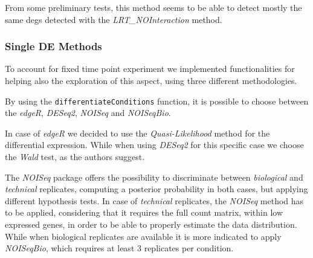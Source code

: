From some preliminary tests, this method seems to be able to detect mostly the same \glspl{deg} detected with the \textit{LRT\_NOInteraction} method.

%


\subsubsection{Single DE Methods}

To account for fixed time point experiment we implemented functionalities for helping also the exploration of this aspect, using three different methodologies.
 

By using the \lstinline!differentiateConditions! function, it is possible to choose between the \textit{edgeR}, \textit{DESeq2}, \textit{NOISeq} and \textit{NOISeqBio}.

In case of \textit{edgeR} we decided to use the \textit{Quasi-Likelihood} method for the differential expression.
While when using \textit{DESeq2} for this specific case we choose the \textit{Wald} test, as the authors suggest.

The \textit{NOISeq} package offers the possibility to discriminate between \textit{biological} and \textit{technical} replicates, computing a posterior probability in both cases, but applying different hypothesis tests.
In case of \textit{technical} replicates, the \textit{NOISeq} method has to be applied, considering that it requires the full count matrix, within low expressed genes, in order to be able to properly estimate the data distribution.
While when biological replicates are available it is more indicated to apply \textit{NOISeqBio}, which requires at least 3 replicates per condition.



